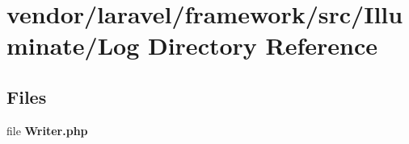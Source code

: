 \section{vendor/laravel/framework/src/\+Illuminate/\+Log Directory Reference}
\label{dir_86be5f3f8d194c5889ea451a5abbd16f}
\subsection*{Files}
\begin{DoxyCompactItemize}
\item 
file {\bf Writer.\+php}
\end{DoxyCompactItemize}
